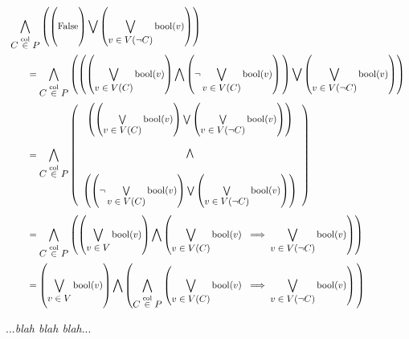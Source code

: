 \documentclass{article}
\newcommand{\combine}[7]{#1 #2 \vphantom{#6} #3 #4 #5 #6 \vphantom{#2} #7}
\begin{document}
	\[
	\begin{array}{l}
		\displaystyle \bigwedge \limits_{\displaystyle C \overset{\mathrm{col}}{\in} P} \left( \combine{\left(}{\mathrm{False}}{\right)}{\bigvee}{\left(}{\bigvee \limits_{\displaystyle v \in V(\neg C)} \mathrm{bool}(v)}{\right)} \right) \\ [24pt]

		\displaystyle\qquad = \bigwedge \limits_{\displaystyle C \overset{\mathrm{col}}{\in} P} \left( \combine{\left(}{\combine{\left(}{\bigvee \limits_{\displaystyle v \in V(C)} \mathrm{bool}(v)}{\right)}{\bigwedge}{\left(}{\neg \bigvee \limits_{\displaystyle v \in V(C)} \mathrm{bool}(v)}{\right)}}{\right)}{\bigvee}{\left(}{\bigvee \limits_{\displaystyle v \in V(\neg C)} \mathrm{bool}(v)}{\right)} \right) \\ [24pt]

		\displaystyle\qquad = \bigwedge \limits_{\displaystyle C \overset{\mathrm{col}}{\in} P} \left( \begin{array}{c}
			\left( \combine{\left(}{\bigvee \limits_{\displaystyle v \in V(C)} \mathrm{bool}(v)}{\right)}{\bigvee}{\left(}{\bigvee \limits_{\displaystyle v \in V(\neg C)} \mathrm{bool}(v)}{\right)} \right) \\ [24pt]
			\bigwedge \\ [16pt]
			\left( \combine{\left(}{\neg \bigvee \limits_{\displaystyle v \in V(C)} \mathrm{bool}(v)}{\right)}{\bigvee}{\left(}{\bigvee \limits_{\displaystyle v \in V(\neg C)} \mathrm{bool}(v)}{\right)} \right)
		\end{array}
		\right) \\ [58pt]

		\displaystyle\qquad = \bigwedge \limits_{\displaystyle C \overset{\mathrm{col}}{\in} P} \left( \combine{\left(}{\bigvee \limits_{\displaystyle v \in V} \mathrm{bool}(v)}{\right)}{\bigwedge}{\left(}{\bigvee \limits_{\displaystyle v \in V(C)} \mathrm{bool}(v)\ \implies \bigvee \limits_{\displaystyle v \in V(\neg C)} \mathrm{bool}(v)}{\right)} \right) \\ [24pt]

		\displaystyle\qquad = \combine{\left(}{\bigvee \limits_{\displaystyle v \in V} \mathrm{bool}(v)}{\right)}{\bigwedge}{\left(}{\bigwedge \limits_{\displaystyle C \overset{\mathrm{col}}{\in} P} \left( \bigvee \limits_{\displaystyle v \in V(C)} \mathrm{bool}(v)\ \implies \bigvee \limits_{\displaystyle v \in V(\neg C)} \mathrm{bool}(v) \right)}{\right)}
	\end{array}
	\]

	...\textit{blah blah blah}...
\end{document}

